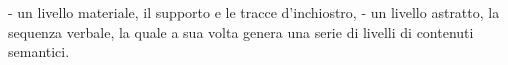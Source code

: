 





- un livello materiale, il supporto e le tracce d’inchiostro, 
- un livello astratto, la sequenza verbale, la quale a sua volta genera una serie di livelli di contenuti semantici.






